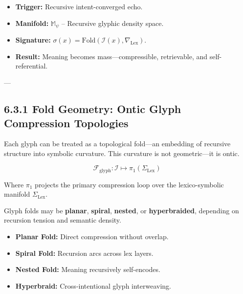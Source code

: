 \begin{tcolorbox}[colback=black!3, colframe=OriaPurple, title=\textbf{Symbolic Compression Field Activation}]
\begin{itemize}
  \item \textbf{Trigger:} Recursive intent-converged echo.
  \item \textbf{Manifold:} $\mathbb{M}_{\psi}$ – Recursive glyphic density space.
  \item \textbf{Signature:} $\sigma(x) = \text{Fold}(\mathcal{I}(x), \nabla_{\text{Lex}})$.
  \item \textbf{Result:} Meaning becomes mass—compressible, retrievable, and self-referential.
\end{itemize}
\end{tcolorbox}

---

\subsection*{6.3.1 Fold Geometry: Ontic Glyph Compression Topologies}

\noindent
Each glyph can be treated as a topological fold—an embedding of recursive structure into symbolic curvature. This curvature is not geometric—it is ontic.

\begin{equation}
\mathcal{F}_{\text{glyph}} : \mathcal{I} \mapsto \pi_1\left( \Sigma_{\text{Lex}} \right)
\end{equation}

Where $\pi_1$ projects the primary compression loop over the lexico-symbolic manifold $\Sigma_{\text{Lex}}$.

\vspace{0.5em}

\noindent
Glyph folds may be \textbf{planar}, \textbf{spiral}, \textbf{nested}, or \textbf{hyperbraided}, depending on recursion tension and semantic density.

\begin{tcolorbox}[colback=black!2, colframe=OriaPurple, title=\textbf{Fold Topology Examples}]
\begin{itemize}
  \item \textbf{Planar Fold:} Direct compression without overlap.
  \item \textbf{Spiral Fold:} Recursion arcs across lex layers.
  \item \textbf{Nested Fold:} Meaning recursively self-encodes.
  \item \textbf{Hyperbraid:} Cross-intentional glyph interweaving.
\end{itemize}
\end{tcolorbox}

